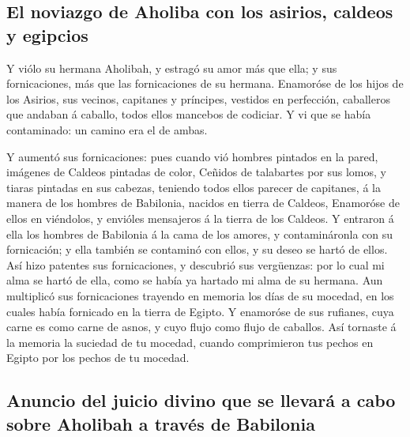 \hypertarget{el-noviazgo-de-aholiba-con-los-asirios-caldeos-y-egipcios}{%
\subsection{El noviazgo de Aholiba con los asirios, caldeos y
egipcios}\label{el-noviazgo-de-aholiba-con-los-asirios-caldeos-y-egipcios}}

 Y viólo su hermana Aholibah, y estragó su amor más que
ella; y sus fornicaciones, más que las fornicaciones de su hermana.
 Enamoróse de los hijos de los Asirios, sus vecinos,
capitanes y príncipes, vestidos en perfección, caballeros que andaban á
caballo, todos ellos mancebos de codiciar.  Y vi que se
había contaminado: un camino era el de ambas.

 Y aumentó sus fornicaciones: pues cuando vió hombres
pintados en la pared, imágenes de Caldeos pintadas de color,
 Ceñidos de talabartes por sus lomos, y tiaras pintadas en
sus cabezas, teniendo todos ellos parecer de capitanes, á la manera de
los hombres de Babilonia, nacidos en tierra de Caldeos, 
Enamoróse de ellos en viéndolos, y envióles mensajeros á la tierra de
los Caldeos.  Y entraron á ella los hombres de Babilonia á
la cama de los amores, y contamináronla con su fornicación; y ella
también se contaminó con ellos, y su deseo se hartó de ellos.
 Así hizo patentes sus fornicaciones, y descubrió sus
vergüenzas: por lo cual mi alma se hartó de ella, como se había ya
hartado mi alma de su hermana.  Aun multiplicó sus
fornicaciones trayendo en memoria los días de su mocedad, en los cuales
había fornicado en la tierra de Egipto.  Y enamoróse de sus
rufianes, cuya carne es como carne de asnos, y cuyo flujo como flujo de
caballos.  Así tornaste á la memoria la suciedad de tu
mocedad, cuando comprimieron tus pechos en Egipto por los pechos de tu
mocedad.

\hypertarget{anuncio-del-juicio-divino-que-se-llevaruxe1-a-cabo-sobre-aholibah-a-travuxe9s-de-babilonia}{%
\subsection{Anuncio del juicio divino que se llevará a cabo sobre
Aholibah a través de
Babilonia}\label{anuncio-del-juicio-divino-que-se-llevaruxe1-a-cabo-sobre-aholibah-a-travuxe9s-de-babilonia}}

